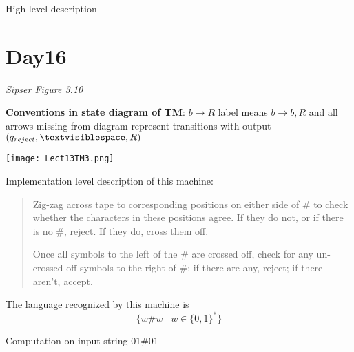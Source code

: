\documentclass[12pt, oneside]{article}
\begin{document}
\vfill

High-level description

\vfill

\newpage
 \vfill
\section*{Day16}



{\it Sipser Figure  3.10}

{\bf Conventions in state diagram of TM}: $b \to R$ label means $b \to b, R$ and
all arrows missing from diagram represent transitions with output $(q_{reject}, \textvisiblespace , R)$

\begin{multicols}{2}
\vspace{-20pt}
\begin{center}
\texttt{[image: Lect13TM3.png]}
\end{center}

Implementation level description of this machine:
\begin{quote}
Zig-zag across tape to corresponding positions on either side of $\#$ to check whether the 
characters in these positions agree. If they do not, or if there is no $\#$, reject. If they 
do, cross them off.

Once all symbols to the left of the $\#$ are crossed off, check for any un-crossed-off symbols 
to the right of $\#$; if there are any, reject; if there aren't, accept.
\end{quote}

The language recognized by this machine is
\[
  \{ w \# w \mid w \in \{0,1\}^* \}
\]

\columnbreak

Computation on  input  string  $01\#01$


\end{multicols}
\end{document}
